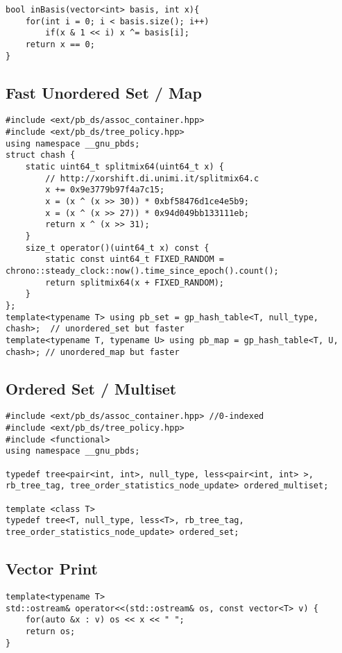 \documentclass[8pt, headheight=10pt, a4paper]{article}
\begin{document}
\begin{multicols*}{3}
\begin{lstlisting}
bool inBasis(vector<int> basis, int x){
    for(int i = 0; i < basis.size(); i++)
        if(x & 1 << i) x ^= basis[i];
    return x == 0;
}
\end{lstlisting}

\subsection{Fast Unordered Set / Map}
\begin{lstlisting}
#include <ext/pb_ds/assoc_container.hpp>
#include <ext/pb_ds/tree_policy.hpp>
using namespace __gnu_pbds;
struct chash {
    static uint64_t splitmix64(uint64_t x) {
        // http://xorshift.di.unimi.it/splitmix64.c
        x += 0x9e3779b97f4a7c15;
        x = (x ^ (x >> 30)) * 0xbf58476d1ce4e5b9;
        x = (x ^ (x >> 27)) * 0x94d049bb133111eb;
        return x ^ (x >> 31);
    }
    size_t operator()(uint64_t x) const {
        static const uint64_t FIXED_RANDOM = chrono::steady_clock::now().time_since_epoch().count();
        return splitmix64(x + FIXED_RANDOM);
    }
};
template<typename T> using pb_set = gp_hash_table<T, null_type, chash>;  // unordered_set but faster
template<typename T, typename U> using pb_map = gp_hash_table<T, U, chash>; // unordered_map but faster
\end{lstlisting}

\subsection{Ordered Set / Multiset}
\begin{lstlisting}
#include <ext/pb_ds/assoc_container.hpp> //0-indexed
#include <ext/pb_ds/tree_policy.hpp>
#include <functional>
using namespace __gnu_pbds;

typedef tree<pair<int, int>, null_type, less<pair<int, int> >, rb_tree_tag, tree_order_statistics_node_update> ordered_multiset;

template <class T>
typedef tree<T, null_type, less<T>, rb_tree_tag, tree_order_statistics_node_update> ordered_set;
\end{lstlisting}

\subsection{Vector Print}
\begin{lstlisting}
template<typename T>
std::ostream& operator<<(std::ostream& os, const vector<T> v) {
    for(auto &x : v) os << x << " ";
    return os;
}
\end{lstlisting}

\end{multicols*}
\end{document}
